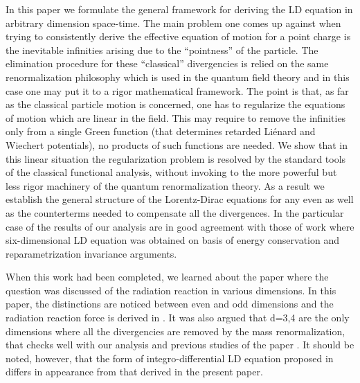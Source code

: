 \documentclass[a4paper,12pt]{article}
\begin{document}
In this paper we formulate the general framework for deriving the LD
equation in arbitrary dimension space-time. The main problem one comes up
against when trying to consistently derive the effective equation of motion
for a point charge is the inevitable infinities arising due to the
``pointness'' of the particle. The elimination procedure for these
``classical'' divergencies is relied on the same renormalization philosophy
which is used in the quantum field theory and in this case one may put it to
a rigor mathematical framework. The point is that, as far as the classical
particle motion is concerned, one has to regularize the equations of motion
which are linear in the field. This may require to remove the infinities
only from a single Green function (that determines retarded Li\'enard and
Wiechert potentials), no products of such functions are needed. We show that
in this linear situation the regularization problem is resolved by the
standard tools of the classical functional analysis, without invoking to the
more powerful but less rigor machinery of the quantum renormalization
theory. As a result we establish the general structure of the Lorentz-Dirac
equations for any even \coordHE{} as well as the counterterms needed to compensate
all the divergences. In the particular case of \coordHE{} the results of our
analysis are in good agreement with those of work \cite{Kos} where
six-dimensional LD equation was obtained on basis of energy conservation and
reparametrization invariance arguments.

When this work had been completed, we learned about the paper
\cite{Gal'tsov} where the question was discussed of the radiation
reaction in various dimensions. In this paper, the distinctions are
noticed between even and odd dimensions and the radiation reaction
force is derived in \coordHE{}. It was also argued that d=3,4 are the only
dimensions where all the divergencies are removed by the mass
renormalization, that checks well with our analysis and previous
studies of the paper \cite{Kos}. It should be noted, however, that
the form of \coordHE{} integro-differential LD equation proposed in
\cite{Gal'tsov} differs in appearance from that derived in the
present paper.
\end{document}
